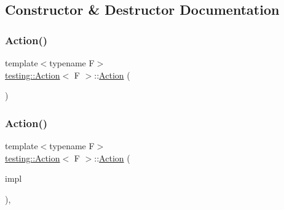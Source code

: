\subsection{Constructor \& Destructor Documentation}
\mbox{\label{classtesting_1_1Action_a967772922a39dd7098bee429d749f277}} 
\subsubsection{\texorpdfstring{Action()}{Action()}\hspace{0.1cm}{\footnotesize\ttfamily [1/4]}}
{\footnotesize\ttfamily template$<$typename F$>$ \\
\mbox{\hyperlink{classtesting_1_1Action}{testing\+::\+Action}}$<$ F $>$\+::\mbox{\hyperlink{classtesting_1_1Action}{Action}} (\begin{DoxyParamCaption}{ }\end{DoxyParamCaption})\hspace{0.3cm}{\ttfamily [inline]}}

\mbox{\label{classtesting_1_1Action_a5ce44c673e3f91378777b954d88917cd}} 
\subsubsection{\texorpdfstring{Action()}{Action()}\hspace{0.1cm}{\footnotesize\ttfamily [2/4]}}
{\footnotesize\ttfamily template$<$typename F$>$ \\
\mbox{\hyperlink{classtesting_1_1Action}{testing\+::\+Action}}$<$ F $>$\+::\mbox{\hyperlink{classtesting_1_1Action}{Action}} (\begin{DoxyParamCaption}\item[{\mbox{\hyperlink{classtesting_1_1ActionInterface}{Action\+Interface}}$<$ F $>$ $\ast$}]{impl }\end{DoxyParamCaption})\hspace{0.3cm}{\ttfamily [inline]}, {\ttfamily [explicit]}}

\mbox{\label{classtesting_1_1Action_a806bacddaa1f1daf61f89674564bdf0f}} 
